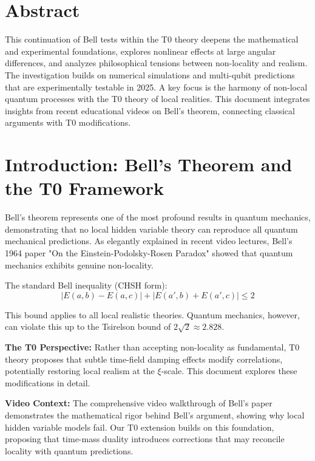 \section*{Abstract}
This continuation of Bell tests within the T0 theory deepens the mathematical and experimental foundations, explores nonlinear effects at large angular differences, and analyzes philosophical tensions between non-locality and realism. The investigation builds on numerical simulations and multi-qubit predictions that are experimentally testable in 2025. A key focus is the harmony of non-local quantum processes with the T0 theory of local realities. This document integrates insights from recent educational videos on Bell's theorem\cite{youtube_bell2025}, connecting classical arguments with T0 modifications.



\section{Introduction: Bell's Theorem and the T0 Framework}
\label{sec:intro_extended}

Bell's theorem\cite{wiki_bell} represents one of the most profound results in quantum mechanics, demonstrating that no local hidden variable theory can reproduce all quantum mechanical predictions. As elegantly explained in recent video lectures\cite{youtube_bell2025}, Bell's 1964 paper "On the Einstein-Podolsky-Rosen Paradox" showed that quantum mechanics exhibits genuine non-locality.

The standard Bell inequality (CHSH form):
\begin{equation}
|E(a,b) - E(a,c)| + |E(a',b) + E(a',c)| \leq 2
\label{eq:chsh_standard}
\end{equation}

This bound applies to all local realistic theories. Quantum mechanics, however, can violate this up to the Tsirelson bound of $2\sqrt{2} \approx 2.828$.

\textbf{The T0 Perspective:} Rather than accepting non-locality as fundamental, T0 theory proposes that subtle time-field damping effects modify correlations, potentially restoring local realism at the $\xi$-scale. This document explores these modifications in detail.

\textbf{Video Context:} The comprehensive video walkthrough of Bell's paper\cite{youtube_bell2025} demonstrates the mathematical rigor behind Bell's argument, showing why local hidden variable models fail. Our T0 extension builds on this foundation, proposing that time-mass duality introduces corrections that may reconcile locality with quantum predictions.

